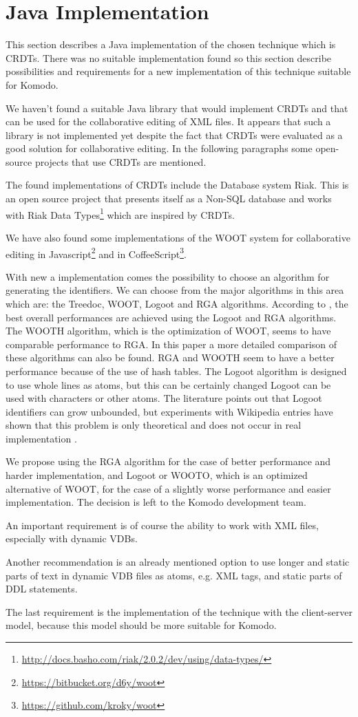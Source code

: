 \documentclass[12pt,oneside]{fithesis2}
\begin{document}
\section{Java Implementation}
\par This section describes a Java implementation of the chosen technique which is CRDTs. There was no suitable implementation found so this section describe possibilities and requirements for a new implementation of this technique suitable for Komodo. 
\par We haven't found a suitable Java library that would implement CRDTs and that can be used for the collaborative editing of XML files. It appears that such a library is not implemented yet despite the fact that CRDTs were evaluated as a good solution for collaborative editing. In the following paragraphs some open-source projects that use CRDTs are mentioned. 
\par The found implementations of CRDTs include the Database system Riak. This is an open source project that presents itself as a Non-SQL database and works with Riak Data Types\footnote{\url{http://docs.basho.com/riak/2.0.2/dev/using/data-types/}} which are inspired by CRDTs.
\par We have also found some implementations of the WOOT system for collaborative editing in Javascript\footnote{\url{https://bitbucket.org/d6y/woot}} and in CoffeeScript\footnote{\url{https://github.com/kroky/woot}}.
\par With new a implementation comes the possibility to choose an algorithm for generating the identifiers. We can choose from the major algorithms in this area which are: the Treedoc, WOOT, Logoot and RGA algorithms. According to \cite{CRDT-real}, the best overall performances are achieved using the Logoot and RGA algorithms. The WOOTH algorithm, which is the optimization of WOOT, seems to have comparable performance to RGA. In this paper a more detailed comparison of these algorithms can also be found. RGA and WOOTH seem to have a better performance because of the use of hash tables. The Logoot algorithm is designed to use whole lines as atoms, but this can be certainly changed Logoot can be used with characters or other atoms. The literature points out that Logoot identifiers can grow unbounded, but experiments with Wikipedia entries have shown that this problem is only theoretical and does not occur in real implementation \cite{Logoot2}.
\par We propose using the RGA algorithm for the case of better performance and harder implementation, and Logoot or WOOTO, which is an optimized alternative of WOOT, for the case of a slightly worse performance and easier implementation. The decision is left to the Komodo development team.
\par An important requirement is of course the ability to work with XML files, especially with dynamic VDBs.
\par Another recommendation is an already mentioned option to use longer and static parts of text in dynamic VDB files as atoms, e.g. XML tags, and static parts of DDL statements.
\par The last requirement is the implementation of the technique with the client-server model, because this model should be more suitable for Komodo.
\end{document}
